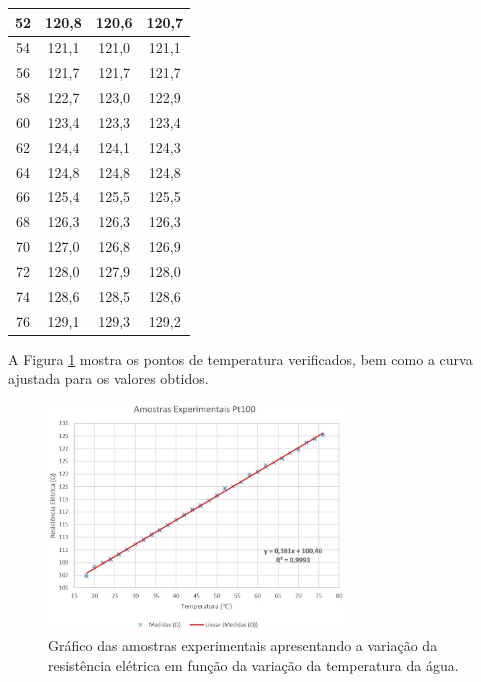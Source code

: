 \documentclass[a4paper]{instrumentacao}
\begin{document}
\begin{table}[H]
\begin{tabular}{|c|c|c|c|}
52                  & 120,8                 & 120,6                 & 120,7          \\ \hline
54                  & 121,1                 & 121,0                 & 121,1          \\ \hline
56                  & 121,7                 & 121,7                 & 121,7          \\ \hline
58                  & 122,7                 & 123,0                 & 122,9          \\ \hline
60                  & 123,4                 & 123,3                 & 123,4          \\ \hline
62                  & 124,4                 & 124,1                 & 124,3          \\ \hline
64                  & 124,8                 & 124,8                 & 124,8          \\ \hline
66                  & 125,4                 & 125,5                 & 125,5          \\ \hline
68                  & 126,3                 & 126,3                 & 126,3          \\ \hline
70                  & 127,0                 & 126,8                 & 126,9          \\ \hline
72                  & 128,0                 & 127,9                 & 128,0          \\ \hline
74                  & 128,6                 & 128,5                 & 128,6          \\ \hline
76                  & 129,1                 & 129,3                 & 129,2          \\ \hline
\end{tabular}
\end{table}

A Figura \ref{fig:pt100-amostras}  mostra os pontos de temperatura verificados, bem como a curva ajustada para os valores obtidos.

\begin{figure}[H]
\center
\includegraphics[width=0.7\textwidth]{grafico_pt100.jpg}
\caption{Gráfico das amostras experimentais apresentando a variação da resistência elétrica em função da variação da temperatura da água.}
\label{fig:pt100-amostras}
\end{figure}
\end{document}

